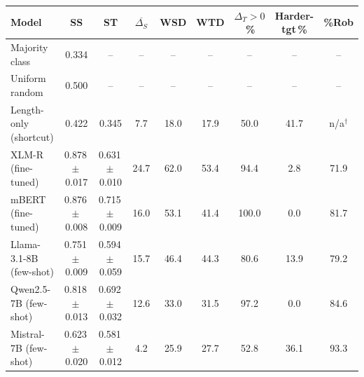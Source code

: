 \begin{tabular}{lcccccccc}
\toprule
Model & SS & ST & $\overline{\Delta_S}$ & WSD & WTD & $\Delta_T{>}0$\,\% & Harder-tgt\,\% & \%Rob \\
\midrule
Majority class & 0.334 & -- & -- & -- & -- & -- & -- & -- \\
Uniform random & 0.500 & -- & -- & -- & -- & -- & -- & -- \\
Length-only (shortcut) & 0.422 & 0.345 & 7.7 & 18.0 & 17.9 & 50.0 & 41.7 & n/a$^\dagger$ \\
\midrule
XLM-R (fine-tuned) & 0.878\,$\pm$\,0.017 & 0.631\,$\pm$\,0.010 & 24.7 & 62.0 & 53.4 & 94.4 & 2.8 & 71.9 \\
mBERT (fine-tuned) & 0.876\,$\pm$\,0.008 & 0.715\,$\pm$\,0.009 & 16.0 & 53.1 & 41.4 & 100.0 & 0.0 & 81.7 \\
\midrule
Llama-3.1-8B (few-shot) & 0.751\,$\pm$\,0.009 & 0.594\,$\pm$\,0.059 & 15.7 & 46.4 & 44.3 & 80.6 & 13.9 & 79.2 \\
Qwen2.5-7B (few-shot) & 0.818\,$\pm$\,0.013 & 0.692\,$\pm$\,0.032 & 12.6 & 33.0 & 31.5 & 97.2 & 0.0 & 84.6 \\
Mistral-7B (few-shot) & 0.623\,$\pm$\,0.020 & 0.581\,$\pm$\,0.012 & 4.2 & 25.9 & 27.7 & 52.8 & 36.1 & 93.3 \\
\bottomrule
\end{tabular}
